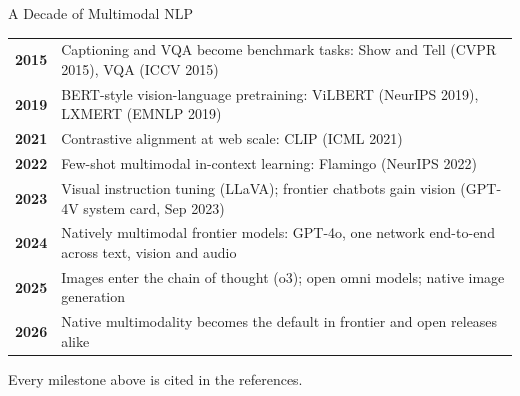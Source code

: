 \begin{frame}{A Decade of Multimodal NLP}
  \small
  \begin{tabular}{@{}p{1.2cm}p{12.1cm}@{}}
    \textbf{2015} & Captioning and VQA become benchmark tasks: Show and Tell (CVPR 2015), VQA (ICCV 2015) \\[0.25em]
    \textbf{2019} & BERT-style vision-language pretraining: ViLBERT (NeurIPS 2019), LXMERT (EMNLP 2019) \\[0.25em]
    \textbf{2021} & Contrastive alignment at web scale: CLIP (ICML 2021) \\[0.25em]
    \textbf{2022} & Few-shot multimodal in-context learning: Flamingo (NeurIPS 2022) \\[0.25em]
    \textbf{2023} & Visual instruction tuning (LLaVA); frontier chatbots gain vision (GPT-4V system card, Sep 2023) \\[0.25em]
    \textbf{2024} & Natively multimodal frontier models: GPT-4o, one network end-to-end across text, vision and audio \\[0.25em]
    \textbf{2025} & Images enter the chain of thought (o3); open omni models; native image generation \\[0.25em]
    \textbf{2026} & Native multimodality becomes the default in frontier and open releases alike \\
  \end{tabular}
  \vspace{0.6em}

  {\scriptsize Every milestone above is cited in the references.}
\end{frame}
